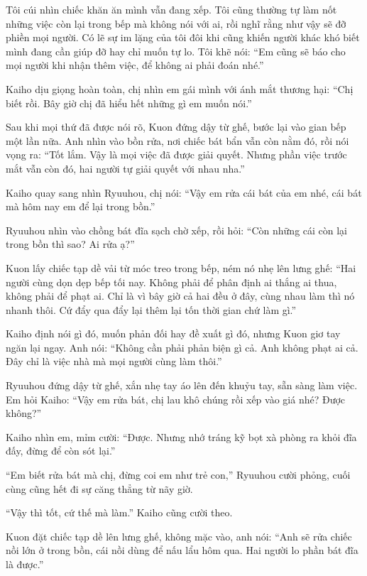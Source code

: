 \documentclass[../main.tex]{subfiles}
\begin{document}
Tôi cúi nhìn chiếc khăn ăn mình vẫn đang xếp. Tôi cũng thường tự làm nốt những việc còn lại trong bếp mà không nói với ai, rồi nghĩ rằng như vậy sẽ đỡ phiền mọi người. Có lẽ sự im lặng của tôi đôi khi cũng khiến người khác khó biết mình đang cần giúp đỡ hay chỉ muốn tự lo. Tôi khẽ nói: ``Em cũng sẽ báo cho mọi người khi nhận thêm việc, để không ai phải đoán nhé.''

Kaiho dịu giọng hoàn toàn, chị nhìn em gái mình với ánh mắt thương hại: ``Chị biết rồi. Bây giờ chị đã hiểu hết những gì em muốn nói.''

\ct

Sau khi mọi thứ đã được nói rõ, Kuon đứng dậy từ ghế, bước lại vào gian bếp một lần nữa. Anh nhìn vào bồn rửa, nơi chiếc bát bẩn vẫn còn nằm đó, rồi nói vọng ra: ``Tốt lắm. Vậy là mọi việc đã được giải quyết. Nhưng phần việc trước mắt vẫn còn đó, hai người tự giải quyết với nhau nha.''

Kaiho quay sang nhìn Ryuuhou, chị nói: ``Vậy em rửa cái bát của em nhé, cái bát mà hôm nay em để lại trong bồn.''

Ryuuhou nhìn vào chồng bát đĩa sạch chờ xếp, rồi hỏi: ``Còn những cái còn lại trong bồn thì sao? Ai rửa ạ?''

Kuon lấy chiếc tạp dề vải từ móc treo trong bếp, ném nó nhẹ lên lưng ghế: ``Hai người cùng dọn dẹp bếp tối nay. Không phải để phân định ai thắng ai thua, không phải để phạt ai. Chỉ là vì bây giờ cả hai đều ở đây, cùng nhau làm thì nó nhanh thôi. Cứ đẩy qua đẩy lại thêm lại tốn thời gian chứ làm gì.''

Kaiho định nói gì đó, muốn phản đối hay đề xuất gì đó, nhưng Kuon giơ tay ngăn lại ngay. Anh nói: ``Không cần phải phản biện gì cả. Anh không phạt ai cả. Đây chỉ là việc nhà mà mọi người cùng làm thôi.''

Ryuuhou đứng dậy từ ghế, xắn nhẹ tay áo lên đến khuỷu tay, sẵn sàng làm việc. Em hỏi Kaiho: ``Vậy em rửa bát, chị lau khô chúng rồi xếp vào giá nhé? Được không?''

Kaiho nhìn em, mỉm cười: ``Được. Nhưng nhớ tráng kỹ bọt xà phòng ra khỏi đĩa đấy, đừng để còn sót lại.''

``Em biết rửa bát mà chị, đừng coi em như trẻ con,'' Ryuuhou cười phỏng, cuối cùng cũng hết đi sự căng thẳng từ nãy giờ.

``Vậy thì tốt, cứ thế mà làm.'' Kaiho cũng cười theo.

Kuon đặt chiếc tạp dề lên lưng ghế, không mặc vào, anh nói: ``Anh sẽ rửa chiếc nồi lớn ở trong bồn, cái nồi dùng để nấu lẩu hôm qua. Hai người lo phần bát đĩa là được.''
\end{document}
